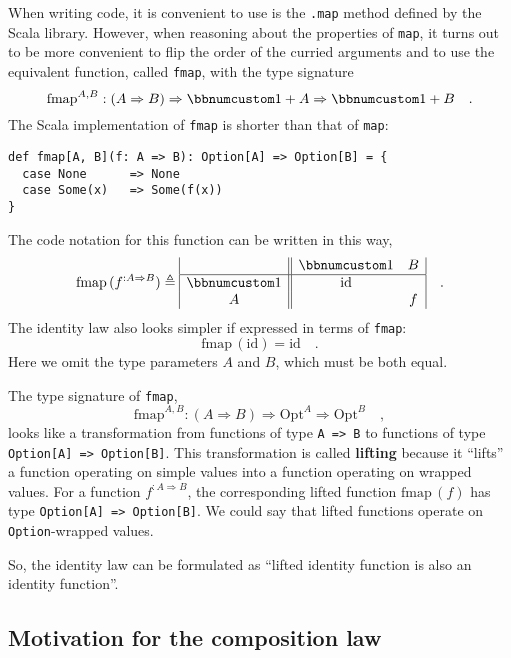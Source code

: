 When writing code, it is convenient to use is the \lstinline!.map!
method defined by the Scala library. However, when reasoning about
the properties of \lstinline!map!, it turns out to be more convenient
to flip the order of the curried arguments and to use the equivalent
function, called \lstinline!fmap!, with the type signature
\[
\text{fmap}^{A,B}:\left(A\Rightarrow B\right)\Rightarrow\bbnum 1+A\Rightarrow\bbnum 1+B\quad.
\]
The Scala implementation of \lstinline!fmap! is shorter than that
of \lstinline!map!:
\begin{lstlisting}
def fmap[A, B](f: A => B): Option[A] => Option[B] = {
  case None      => None
  case Some(x)   => Some(f(x))
}
\end{lstlisting}
The code notation for this function can be written in this way,
\begin{equation}
\text{fmap}\,(f^{:A\Rightarrow B})\triangleq\begin{array}{|c||cc|}
 & \bbnum 1 & B\\
\hline \bbnum 1 & \text{id} & \\
A &  & f
\end{array}\quad.\label{eq:f-def-opt-fmap-matrix-notation}
\end{equation}
The identity law also looks simpler if expressed in terms of \lstinline!fmap!:
\[
\text{fmap}\,(\text{id})=\text{id}\quad.
\]
Here we omit the type parameters $A$ and $B$, which must be both
equal.

The type signature of \lstinline!fmap!,
\[
\text{fmap}^{A,B}:\left(A\Rightarrow B\right)\Rightarrow\text{Opt}^{A}\Rightarrow\text{Opt}^{B}\quad,
\]
looks like a transformation from functions of type \lstinline!A => B!
to functions of type \lstinline!Option[A] => Option[B]!. This transformation
is called \textbf{lifting} because it ``lifts''
a function operating on simple values into a function operating on
wrapped values. For a function $f^{:A\Rightarrow B}$, the corresponding
lifted function $\text{fmap}\,(f)$ has type \lstinline!Option[A] => Option[B]!.
We could say that lifted functions operate on \lstinline!Option!-wrapped
values.

So, the identity law can be formulated as ``lifted identity function
is also an identity function''.

\subsection{Motivation for the composition law}


